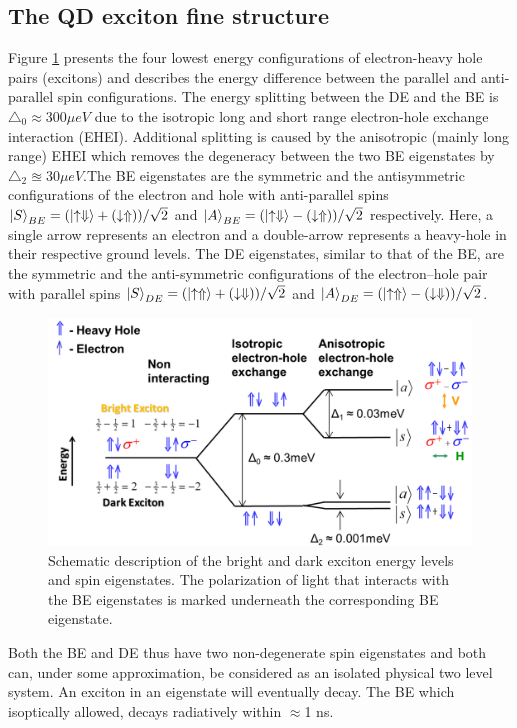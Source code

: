\subsection{The QD exciton fine structure}
Figure \ref{fig:energy_structure}  presents the four lowest energy configurations of electron-heavy hole pairs (excitons) and describes the energy difference between the parallel and anti-parallel spin configurations. The energy splitting between the DE and the BE is $\triangle_0 \approx 300 \mu eV$ due to the isotropic long and short range electron-hole exchange interaction (EHEI). Additional splitting is caused by the anisotropic (mainly long range) EHEI which removes the degeneracy between the two BE eigenstates by $\triangle_2 \approxeq 30 \mu eV $.The BE eigenstates are the symmetric and the antisymmetric configurations of the electron and hole with anti-parallel spins $ \ket{S}_{BE} = (\ket{\uparrow\Downarrow}+(\downarrow\Uparrow))/\sqrt{2}$ and  $ \ket{A}_{BE} = (\ket{\uparrow\Downarrow}-(\downarrow\Uparrow))/\sqrt{2}$ respectively. Here, a single arrow represents an electron and a double-arrow represents a heavy-hole in their respective ground levels. The DE eigenstates, similar to that of the BE, are the symmetric and the anti-symmetric configurations of the electron–hole pair with parallel spins $ \ket{S}_{DE} = (\ket{\uparrow\Uparrow}+(\downarrow\Downarrow))/\sqrt{2}$ and $ \ket{A}_{DE} = (\ket{\uparrow\Uparrow}-(\downarrow\Downarrow))/\sqrt{2}$.
\begin{figure}[H]
	\centering
	\includegraphics[scale=0.32]{figures/energy_structure.png}
	\caption{Schematic description of the bright and dark exciton energy levels and spin eigenstates. The polarization of light that interacts with the BE eigenstates is marked underneath the corresponding BE eigenstate.}
	\label{fig:energy_structure}
\end{figure}
Both the BE and DE thus have two non-degenerate spin eigenstates and both can, under some approximation, be considered as an isolated physical two level system. An exciton in an eigenstate will eventually decay. The BE which isoptically allowed, decays radiatively within $\approx$1 ns.


